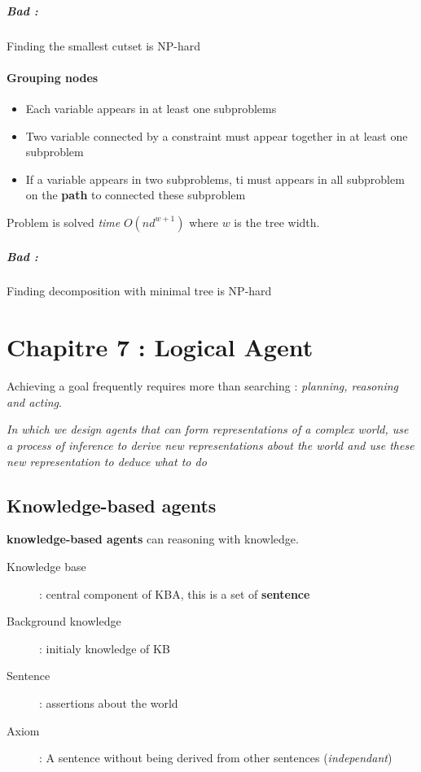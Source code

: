 \subparagraph{Bad :} Finding the smallest cutset is NP-hard


\paragraph{Grouping nodes}
\begin{itemize}
    \item Each variable appears in at least one subproblems
    \item Two variable connected by a constraint must appear together
        in at least one subproblem
    \item If a variable appears in two subproblems, ti must appears in all subproblem
        on the \textbf{path} to connected these subproblem
\end{itemize}

Problem is solved \textit{time} $O(nd^{w+1})$ where $w$ is the tree width.

\subparagraph{Bad :} Finding decomposition with minimal tree is NP-hard


\section{Chapitre 7 : Logical Agent}
Achieving a goal frequently requires more than searching : \textit{planning,
reasoning and acting}.

\textit{In which we design agents that can form representations of a complex world, use a process of inference to derive new representations about the world and use these new representation to deduce what to do}

\subsection{Knowledge-based agents}

\textbf{knowledge-based agents} can reasoning with knowledge.

\begin{description}
    \item[Knowledge base] : central component of KBA, this is a set of \textbf{sentence}
    \item[Background knowledge] : initialy knowledge of KB
    \item[Sentence] : assertions about the world
    \item[Axiom] : A sentence without being derived from other sentences (\textit{independant})
\end{description}

